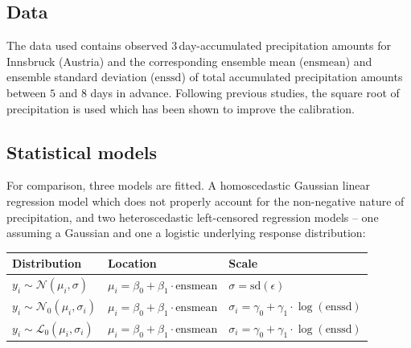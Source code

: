 \documentclass[twoside]{report}
\begin{document}

\subsection{Data}

The data used contains observed 3\,day-accumulated precipitation amounts for
Innsbruck (Austria) and the corresponding ensemble mean ($\text{ensmean}$) and
ensemble standard deviation ($\text{enssd}$) of total accumulated precipitation amounts
between $5$ and $8$ days in advance.
Following previous studies, the square root of precipitation is used which has
been shown to improve the calibration.


\subsection{Statistical models}

For comparison, three models are fitted. A homoscedastic Gaussian linear regression
model which does not properly account for the non-negative nature of precipitation,
and two heteroscedastic left-censored regression models --
one assuming a Gaussian and one a logistic underlying response distribution:

\begin{table}[!ht]\centering
    \begin{tabular}{lll}
         Distribution                              & Location                                         & Scale \\
        \midrule[0.09 em]
        $y_i \sim \mathcal{N}(\mu_i, \sigma)$     & $\mu_i = \beta_0 + \beta_1 \cdot \text{ensmean}$ & $\sigma = \text{sd}(\epsilon)$ \\
        $y_i \sim \mathcal{N}_0(\mu_i, \sigma_i)$ & $\mu_i = \beta_0 + \beta_1 \cdot \text{ensmean}$ & $\sigma_i = \gamma_0 + \gamma_1 \cdot \log(\text{enssd})$ \\
        $y_i \sim \mathcal{L}_0(\mu_i, \sigma_i)$ & $\mu_i = \beta_0 + \beta_1 \cdot \text{ensmean}$ & $\sigma_i = \gamma_0 + \gamma_1 \cdot \log(\text{enssd})$ \\
        \bottomrule[0.09 em]
    \end{tabular}
\end{table}
\end{document}
